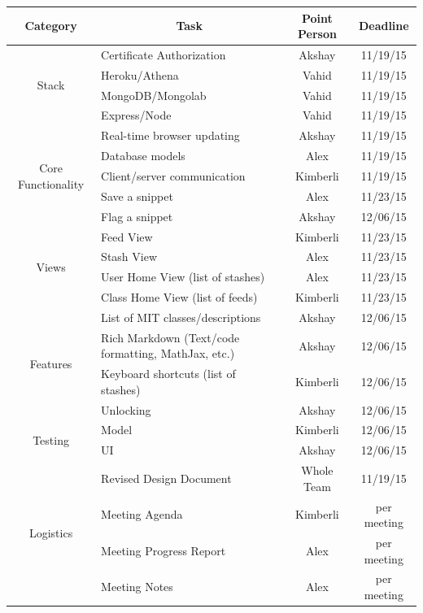 \documentclass{article}
\begin{document}
 \begin{table}[!htbp]
 \centering
\begin{tabular}{|c| l |c|c|}
\hline
\textbf{Category} & \multicolumn{1}{|c|}{\textbf{Task}} & \textbf{Point Person} & \textbf{Deadline} \\
\hline

\multirow{4}{*}{Stack} 
& Certificate Authorization  & Akshay  &  11/19/15 \\\cline{2-4}
& Heroku/Athena    & Vahid  &  11/19/15    \\\cline{2-4}
& MongoDB/Mongolab & Vahid  &  11/19/15    \\\cline{2-4}
& Express/Node  & Vahid  &  11/19/15    \\\cline{2-4}
\hline 

\multirow{5}{*}{Core Functionality} 
& Real-time browser updating  & Akshay  &  11/19/15 \\\cline{2-4}
& Database models    & Alex  &  11/19/15    \\\cline{2-4}
& Client/server communication & Kimberli  &  11/19/15    \\\cline{2-4}
& Save a snippet & Alex  &  11/23/15    \\\cline{2-4}
& Flag a snippet & Akshay  &  12/06/15    \\\cline{2-4}
\hline 

\multirow{4}{*}{Views} 
& Feed View  & Kimberli  &  11/23/15 \\\cline{2-4}
& Stash View  & Alex  &  11/23/15    \\\cline{2-4}
& User Home View (list of stashes)  & Alex  &  11/23/15    \\\cline{2-4}
& Class Home View (list of feeds) & Kimberli  &  11/23/15    \\\cline{2-4}
\hline 

\multirow{4}{*}{Features} 
& List of MIT classes/descriptions  & Akshay  &  12/06/15 \\\cline{2-4}
& Rich Markdown (Text/code formatting, MathJax, etc.)  & Akshay  &  12/06/15    \\\cline{2-4}
& Keyboard shortcuts (list of stashes)  & Kimberli  &  12/06/15    \\\cline{2-4}
& Unlocking  & Akshay  &  12/06/15    \\\cline{2-4}
\hline


\multirow{2}{*}{Testing} 
& Model  & Kimberli  &  12/06/15 \\\cline{2-4}
& UI  & Akshay  &  12/06/15    \\\cline{2-4}
\hline

\multirow{4}{*}{Logistics} 
& Revised Design Document & Whole Team  &  11/19/15 \\\cline{2-4}
& Meeting Agenda & Kimberli  &  per meeting \\\cline{2-4}
& Meeting Progress Report & Alex  &  per meeting \\\cline{2-4}
& Meeting Notes & Alex  &  per meeting \\\cline{2-4}
\hline

\end{tabular}
\end{table}
\end{document}
